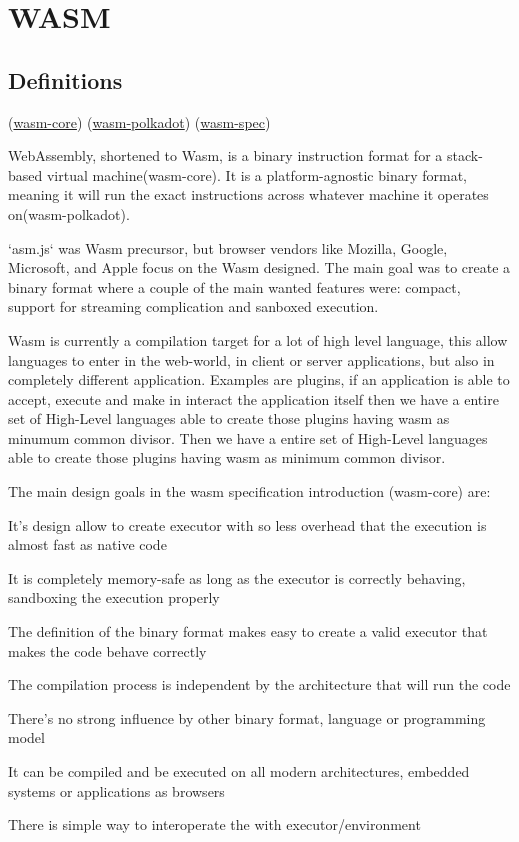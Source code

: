 \documentclass[../main.tex]{subfiles}
\begin{document}
\section{WASM}
\subsection{Definitions}
(\href{https://webassembly.github.io/spec/core/}{wasm-core})
(\href{https://wiki.polkadot.network/docs/learn-wasm}{wasm-polkadot})
(\href{https://www.ngzhian.com/relaxed-simd/core/_download/WebAssembly.pdf}{wasm-spec})

WebAssembly, shortened to Wasm, is a binary instruction format for a stack-based virtual machine(wasm-core). It is a platform-agnostic binary format, meaning it will run the exact instructions across whatever machine it operates on(wasm-polkadot).

`asm.js` was Wasm precursor, but browser vendors like Mozilla, Google, Microsoft, and Apple focus on the Wasm designed. The main goal was to create a binary format where a couple of the main wanted features were: compact, support for streaming complication and sanboxed execution.

Wasm is currently a compilation target for a lot of high level language, this allow languages to enter in the web-world, in client or server applications, but also in completely different application. Examples are plugins, if an application is able to accept, execute and make in interact the application itself then we have a entire set of High-Level languages able to create those plugins having wasm as minumum common divisor. Then we have a entire set of High-Level languages able to create those plugins having wasm as minimum common divisor.

The main design goals in the wasm specification introduction (wasm-core) are:
\begin{description} [style=nextline]
  \item[Fast] It's design allow to create executor with so less overhead that the execution is almost fast as native code
  \item[Safe] It is completely memory-safe as long as the executor is correctly behaving, sandboxing the execution properly
  \item[Well-defined] The definition of the binary format makes easy to create a valid executor that makes the code behave correctly
  \item[Hardware-independent] The compilation process is independent by the architecture that will run the code
  \item[Language-independent] There's no strong influence by other binary format, language or programming model
  \item[Platform-independent] It can be compiled and be executed on all modern architectures, embedded systems or applications as browsers
  \item[Open] There is simple way to interoperate the with executor/environment
\end{description}
\end{document}
